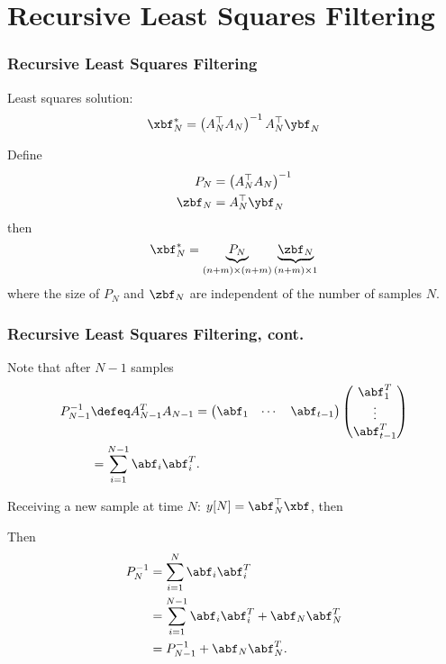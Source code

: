 \documentclass{beamer}
\begin{document}
\section{Recursive Least Squares Filtering}
\frame{\sectionpage}

\begin{frame}\frametitle{Recursive Least Squares Filtering}
Least squares solution:
\[
\xbf_N^\ast = \left(A_N^\top A_N\right)^{-1}A_N^\top \ybf_N
\]

Define
\begin{align*}
	P_N &= \left(A_N^\top A_N\right)^{-1} \\	
	\zbf_N &= A_N^\top \ybf_N
\end{align*}
then
\[
\xbf_N^\ast = \underbrace{P_N}_{(n+m)\times(n+m)} \underbrace{\zbf_N}_{(n+m)\times 1}
\]
where the size of $P_N$ and $\zbf_N$ are independent of the number of samples $N$.
\end{frame}

\begin{frame}\frametitle{Recursive Least Squares Filtering, cont.}
	Note that after $N-1$ samples
	\begin{align*}
		P_{N-1}^{-1} &\defeq A^T_{N-1} A_{N-1} 
		     = \begin{pmatrix}\abf_1 & \cdots & \abf_{t-1}\end{pmatrix} \begin{pmatrix} \abf^T_1 \\ \vdots \\ \abf^T_{t-1} \end{pmatrix} \\
		    &= \sum_{i=1}^{N-1} \abf_i \abf^T_i.
	\end{align*}
	
	\vfill
	
	Receiving a new sample at time $N$: $y[N] = \abf_N^\top \xbf$, then
	
	\vfill
	
	Then 
	\begin{align*}
		P_{N}^{-1} &= \sum_{i=1}^{N} \abf_i \abf^T_i \\
		    &= \sum_{i=1}^{N-1} \abf_i \abf^T_i  + \abf_N \abf_N^T \\
		    &= P_{N-1}^{-1} + \abf_N \abf_N^T.
	\end{align*}
\end{frame}
\end{document}
